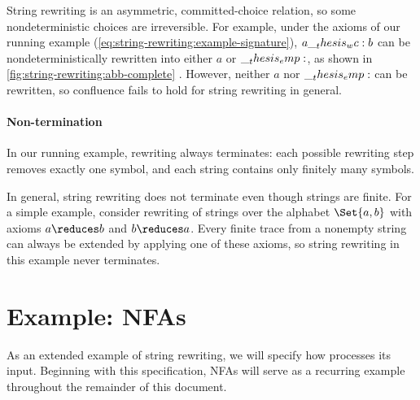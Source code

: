 String rewriting is an asymmetric, committed-choice relation, so some nondeterministic choices are irreversible.
For example, under the axioms of our running example (\cref{eq:string-rewriting:example-signature}), $a \wc b$ can be nondeterministically rewritten into either $a$ or $\__thesis_emp:$, as shown in \cref{fig:string-rewriting:abb-complete}%
.
However, neither $a$ nor $\__thesis_emp:$ can be rewritten, so confluence fails to hold for string rewriting in general.

\paragraph*{Non-termination}
In our running example, rewriting always terminates: each possible rewriting step removes exactly one symbol, and each string contains only finitely many symbols.

In general, string rewriting does not terminate even though strings are finite.
For a simple example, consider rewriting of strings over the alphabet $\Set{a,b}$ with axioms
$a \reduces b$ and $b \reduces a$.
Every finite trace from a nonempty string can always be extended by applying one of these axioms, so string rewriting in this example never terminates.

\section{Example: \Aclp*{NFA}}\label{sec:string-rewriting:nfa}

As an extended example of string rewriting, we will specify how  processes its input.
Beginning with this specification, \acp{NFA} will serve as a recurring example throughout the remainder of this document.
 
